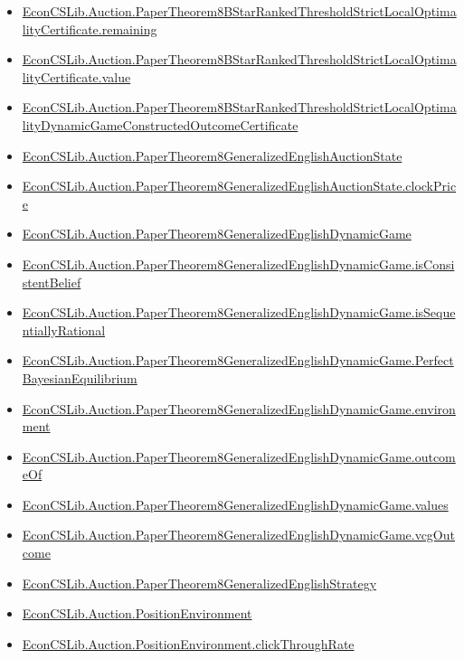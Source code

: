 \documentclass[10pt]{article}
\begin{document}
\begin{itemize}[leftmargin=1.2em]
\begin{itemize}[leftmargin=1.2em]
\item \hyperlink{library-prerequisite-7278df00af8a4fee}{EconCSLib.Auction.PaperTheorem8BStarRankedThresholdStrictLocalOptimalityCertificate.remaining}
\item \hyperlink{library-prerequisite-8846a6409993c4d1}{EconCSLib.Auction.PaperTheorem8BStarRankedThresholdStrictLocalOptimalityCertificate.value}
\item \hyperlink{library-prerequisite-0805cfd197813988}{EconCSLib.Auction.PaperTheorem8BStarRankedThresholdStrictLocalOptimalityDynamicGameConstructedOutcomeCertificate}
\item \hyperlink{library-prerequisite-cbef1b804464ed81}{EconCSLib.Auction.PaperTheorem8GeneralizedEnglishAuctionState}
\item \hyperlink{library-prerequisite-51ae109b929622b7}{EconCSLib.Auction.PaperTheorem8GeneralizedEnglishAuctionState.clockPrice}
\item \hyperlink{library-prerequisite-ef44cbc6743e8972}{EconCSLib.Auction.PaperTheorem8GeneralizedEnglishDynamicGame}
\item \hyperlink{library-prerequisite-d50555a5d52c47c3}{EconCSLib.Auction.PaperTheorem8GeneralizedEnglishDynamicGame.isConsistentBelief}
\item \hyperlink{library-prerequisite-cc4b37986460d5e0}{EconCSLib.Auction.PaperTheorem8GeneralizedEnglishDynamicGame.isSequentiallyRational}
\item \hyperlink{library-prerequisite-7eefd7aba59d22db}{EconCSLib.Auction.PaperTheorem8GeneralizedEnglishDynamicGame.PerfectBayesianEquilibrium}
\item \hyperlink{library-prerequisite-f6b214e2f638fba2}{EconCSLib.Auction.PaperTheorem8GeneralizedEnglishDynamicGame.environment}
\item \hyperlink{library-prerequisite-1efd3b9675c9d66c}{EconCSLib.Auction.PaperTheorem8GeneralizedEnglishDynamicGame.outcomeOf}
\item \hyperlink{library-prerequisite-350238e77e8519eb}{EconCSLib.Auction.PaperTheorem8GeneralizedEnglishDynamicGame.values}
\item \hyperlink{library-prerequisite-d0ffde69638141ba}{EconCSLib.Auction.PaperTheorem8GeneralizedEnglishDynamicGame.vcgOutcome}
\item \hyperlink{library-prerequisite-35edbf6d1a845ae1}{EconCSLib.Auction.PaperTheorem8GeneralizedEnglishStrategy}
\item \hyperlink{library-prerequisite-cb3c8dfd4d01ece3}{EconCSLib.Auction.PositionEnvironment}
\item \hyperlink{library-prerequisite-0083fbb4633e4a3b}{EconCSLib.Auction.PositionEnvironment.clickThroughRate}

\end{itemize}
\end{itemize}
\end{document}
